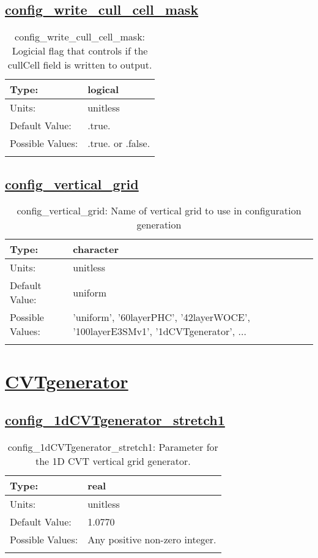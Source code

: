 \subsection[config\_write\_cull\_cell\_mask]{\hyperref[sec:nm_tab_init_setup]{config\_write\_cull\_cell\_mask}}
\label{subsec:nm_sec_config_write_cull_cell_mask}
\begin{center}
\begin{longtable}{| p{2.0in} || p{4.0in} |}
    \hline
    Type: & logical \\
    \hline
    Units: & \si{unitless} \\
    \hline
    Default Value: & .true. \\
    \hline
    Possible Values: & .true. or .false. \\
    \hline
    \caption{config\_write\_cull\_cell\_mask: Logicial flag that controls if the cullCell field is written to output.}
\end{longtable}
\end{center}
\subsection[config\_vertical\_grid]{\hyperref[sec:nm_tab_init_setup]{config\_vertical\_grid}}
\label{subsec:nm_sec_config_vertical_grid}
\begin{center}
\begin{longtable}{| p{2.0in} || p{4.0in} |}
    \hline
    Type: & character \\
    \hline
    Units: & \si{unitless} \\
    \hline
    Default Value: & uniform \\
    \hline
    Possible Values: & 'uniform', '60layerPHC', '42layerWOCE', '100layerE3SMv1', '1dCVTgenerator', ... \\
    \hline
    \caption{config\_vertical\_grid: Name of vertical grid to use in configuration generation}
\end{longtable}
\end{center}
\section[CVTgenerator]{\hyperref[sec:nm_tab_CVTgenerator]{CVTgenerator}}
\label{sec:nm_sec_CVTgenerator}
\subsection[config\_1dCVTgenerator\_stretch1]{\hyperref[sec:nm_tab_CVTgenerator]{config\_1dCVTgenerator\_stretch1}}
\label{subsec:nm_sec_config_1dCVTgenerator_stretch1}
\begin{center}
\begin{longtable}{| p{2.0in} || p{4.0in} |}
    \hline
    Type: & real \\
    \hline
    Units: & \si{unitless} \\
    \hline
    Default Value: & 1.0770 \\
    \hline
    Possible Values: & Any positive non-zero integer. \\
    \hline
    \caption{config\_1dCVTgenerator\_stretch1: Parameter for the 1D CVT vertical grid generator.}
\end{longtable}
\end{center}
